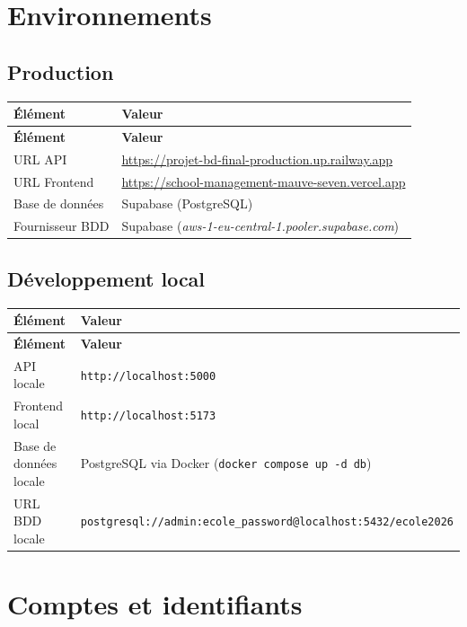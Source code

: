 \documentclass[12pt,a4paper]{report}
\begin{document}
\chapter{Environnements}

\section{Production}

\begin{longtable}{|p{4.5cm}|p{10cm}|}
\hline
\textbf{Élément} & \textbf{Valeur} \\
\hline
\endfirsthead
\hline
\textbf{Élément} & \textbf{Valeur} \\
\hline
\endhead
URL API & \url{https://projet-bd-final-production.up.railway.app} \\
\hline
URL Frontend & \url{https://school-management-mauve-seven.vercel.app} \\
\hline
Base de données & Supabase (PostgreSQL) \\
\hline
Fournisseur BDD & Supabase (\textit{aws-1-eu-central-1.pooler.supabase.com}) \\
\hline
\end{longtable}

\section{Développement local}

\begin{longtable}{|p{4.5cm}|p{10cm}|}
\hline
\textbf{Élément} & \textbf{Valeur} \\
\hline
\endfirsthead
\hline
\textbf{Élément} & \textbf{Valeur} \\
\hline
\endhead
API locale & \texttt{http://localhost:5000} \\
\hline
Frontend local & \texttt{http://localhost:5173} \\
\hline
Base de données locale & PostgreSQL via Docker (\texttt{docker compose up -d db}) \\
\hline
URL BDD locale & \texttt{postgresql://admin:ecole\_password@localhost:5432/ecole2026} \\
\hline
\end{longtable}

\chapter{Comptes et identifiants}
\end{document}
